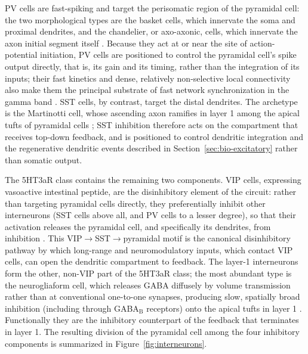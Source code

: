 PV cells are fast-spiking and target the perisomatic region of the pyramidal cell: the two morphological types are the basket cells, 
which innervate the soma and proximal dendrites, and the chandelier, or axo-axonic, cells, which innervate the axon initial segment 
itself \parencite{tremblay2016}. Because they act at or near the site of action-potential initiation, PV cells are positioned to 
control the pyramidal cell's spike output directly, that is, its gain and its timing, rather than the integration of its inputs; their fast 
kinetics and dense, relatively non-selective local connectivity also make them the principal substrate of fast network synchronization 
in the gamma band \parencite{tremblay2016}. SST cells, by contrast, target the distal dendrites. The archetype is the Martinotti cell, 
whose ascending axon ramifies in layer 1 among the apical tufts of pyramidal cells \parencite{tremblay2016}; SST inhibition therefore
 acts on the compartment that receives top-down feedback, and is positioned to control dendritic integration and the regenerative 
 dendritic events described in Section~\ref{sec:bio-excitatory} rather than somatic output.

The 5HT3aR class contains the remaining two components. VIP cells, expressing vasoactive intestinal peptide, are the disinhibitory
 element of the circuit: rather than targeting pyramidal cells directly, they preferentially inhibit other interneurons (SST cells above all, and PV cells to a lesser degree), so that their activation releases the pyramidal cell, and specifically its dendrites, 
 from inhibition \parencite{tremblay2016}. This VIP$\rightarrow$SST$\rightarrow$pyramidal motif is the canonical disinhibitory pathway 
 by which long-range and neuromodulatory inputs, which contact VIP cells, can open the dendritic compartment to feedback. The layer-1 
 interneurons form the other, non-VIP part of the 5HT3aR class; the most abundant type is the neurogliaform cell, which releases GABA 
 diffusely by volume transmission rather than at conventional one-to-one synapses, producing slow, spatially broad inhibition 
 (including through GABA$_\text{B}$ receptors) onto the apical tufts in layer 1 \parencite{tremblay2016}. Functionally they are the 
 inhibitory counterpart of the feedback that terminates in layer 1.
The resulting division of the pyramidal cell among the four inhibitory components is summarized in Figure~\ref{fig:interneurons}.

